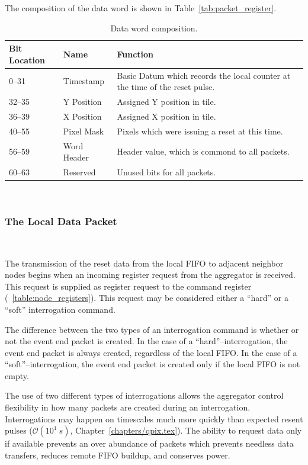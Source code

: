 The composition of the data word is shown in Table~\ref{tab:packet_register}.
\begin{table}
\begin{center}
\begin{tabular}{|| p{30mm} | p{30mm} | p{90mm} ||}
 \hline
 Bit Location & Name & Function \\ [0.5ex]
 \hline\hline
  0--31 & Timestamp & Basic Datum which records the local counter at the time of the reset pulse. \\
 \hline
  32--35 & Y Position & Assigned Y position in tile. \\
 \hline
  36--39 & X Position & Assigned X position in tile. \\
 \hline
  40--55 & Pixel Mask & Pixels which were issuing a reset at this time. \\
 \hline
  56--59 & Word Header & Header value, which is commond to all packets. \\
 \hline
  60--63 & Reserved & Unused bits for all packets. \\
 \hline
\end{tabular}
\caption{Data word composition.}
\end{center}
\end{table}
~\label{tab:packet_data}

\subsubsection{The Local Data Packet}~\label{sec:local_data_packet}

The transmission of the reset data from the local FIFO to adjacent neighbor nodes begins when an incoming register request from the aggregator is received.
This request is supplied as register request to the command register (~\ref{table:node_registers}).
This request may be considered either a ``hard'' or a ``soft'' interrogation command.

The difference between the two types of an interrogation command is whether or not the event end packet is created.
In the case of a ``hard''--interrogation, the event end packet is always created, regardless of the local FIFO.
In the case of a ``soft''--interrogation, the event end packet is created only if the local FIFO is not empty.

The use of two different types of interrogations allows the aggregator control flexibility in how many packets are created during an interrogation.
Interrogations may happen on timescales much more quickly than expected resent pulses ($\mathcal{O}(10^{1}~\unit{s})$, Chapter~\ref{chapters/qpix.tex}).
The ability to request data only if available prevents an over abundance of packets which prevents needless data transfers, reduces remote FIFO buildup, and conserves power.

